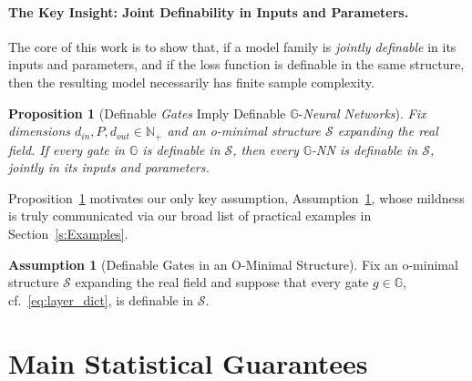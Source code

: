 \documentclass{article}
\theoremstyle{plain}
\newtheorem{proposition}[theorem]{Proposition}
\theoremstyle{definition}
\newtheorem{assumption}[theorem]{Assumption}
\theoremstyle{remark}
\theoremstyle{plain}
\numberwithin{thm}{section}
\theoremstyle{definition}
\numberwithin{equation}{section}
\begin{document}
\paragraph{The Key Insight: Joint Definability in Inputs and Parameters.}
\label{key_insight}
The core of this work is to show that, if a model family is \textit{jointly definable} in its inputs and parameters, and if the loss function is definable in the same structure, then the resulting model necessarily has finite sample complexity.
\begin{proposition}[Definable \emph{Gates} Imply Definable $\mathbb{G}$-\emph{Neural Networks}]
\label{prop:key_insight}
Fix dimensions $d_{in},P,d_{out}\in \mathbb{N}_+$ and an o-minimal structure $\mathcal{S}$ expanding the real field.  
If every gate in $\mathbb{G}$ is definable in $\mathcal{S}$, then every $\mathbb{G}$-NN is definable in $\mathcal{S}$, jointly in its inputs and parameters.
\end{proposition}

Proposition~\ref{prop:key_insight} motivates our only key assumption, Assumption~\ref{ass:bigass}, whose mildness is truly communicated via our broad list of practical examples in Section~\ref{s:Examples}.
\begin{assumption}[Definable Gates in an O-Minimal Structure]
\label{ass:bigass}
Fix an o-minimal structure $\mathcal{S}$ expanding the real field and suppose that every gate $g\in \mathbb{G}$, cf.~\eqref{eq:layer_dict}, is definable in $\mathcal{S}$.
\end{assumption}





\section{Main Statistical Guarantees}
\label{s:Stats}
\end{document}
